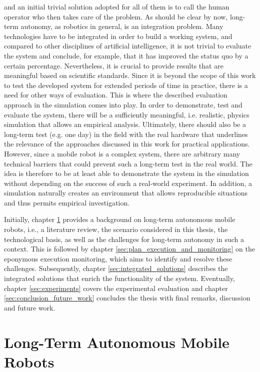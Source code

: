\documentclass[english, master, utf8]{base/thesis_KBS}
\begin{document}
and an initial trivial solution adopted for all of them is to call the human operator who then takes care of the problem.\newline
As should be clear by now, long-term autonomy, as robotics in general, is an integration problem. Many technologies have to be integrated in order to build a working system, 
and compared to other disciplines of artificial intelligence, it is not trivial to evaluate the system and conclude, for example, that it has improved the status quo by a 
certain percentage. Nevertheless, it is crucial to provide results that are meaningful based on scientific standards.
Since it is beyond the scope of this work to test the developed system for extended periods of time in practice, there is a need for other ways of evaluation.
This is where the described evaluation approach in the simulation comes into play. In order to demonstrate, test and evaluate the system, there will be a sufficiently meaningful, 
i.e. realistic, physics simulation that allows an empirical analysis. Ultimately, there should also be a long-term test (e.g. one day) in the field with the real hardware that 
underlines the relevance of the approaches discussed in this work for practical applications. However, since a mobile robot is a complex system, there are arbitrary 
many technical barriers that could prevent such a long-term test in the real world. The idea is therefore to be at least able to demonstrate the system in the simulation
without depending on the success of such a real-world experiment. In addition, a simulation naturally creates an environment that allows reproducible situations and thus permits
empirical investigation.\newline

\noindent
Initially, chapter \ref{sec:lta_mobile_robots} provides a background on long-term autonomous mobile robots, i.e., a literature review, the scenario considered in this thesis,
the technological basis, as well as the challenges for long-term autonomy in such a context. This is followed by chapter \ref{sec:plan_execution_and_monitoring} on the eponymous
execution monitoring, which aims to identify and resolve these challenges. Subsequently, chapter \ref{sec:integrated_solutions} describes the integrated solutions that enrich the
functionality of the system. Eventually, chapter \ref{sec:experiments} covers the experimental evaluation and chapter \ref{sec:conclusion_future_work} concludes the thesis with
final remarks, discussion and future work.

\chapter{Long-Term Autonomous Mobile Robots}
\label{sec:lta_mobile_robots}
\end{document}
